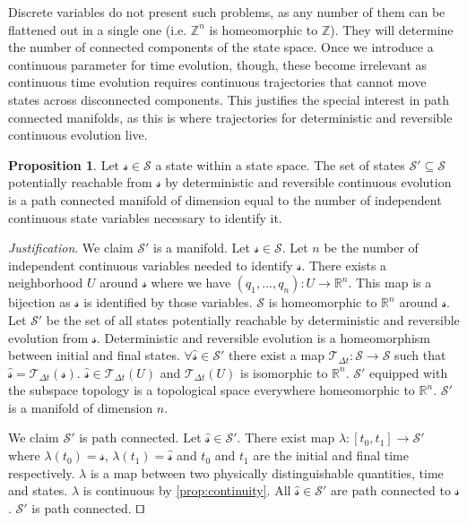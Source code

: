 \documentclass[smallextended]{svjour3}
\numberwithin{equation}{section}
\newenvironment{justification}{\emph{Justification}.}{\hfill\(\qed\)}
\theoremstyle{definition}
\newtheorem{prop}[equation]{Proposition}
\newenvironment{justification}{\emph{Justification}.}{\qed}
\begin{document}
Discrete variables do not present such problems, as any number of them can be flattened out in a single one (i.e. $\mathbb{Z}^n$ is homeomorphic to $\mathbb{Z}$). They will determine the number of connected components of the state space. Once we introduce a continuous parameter for time evolution, though, these become irrelevant as continuous time evolution requires continuous trajectories that cannot move states across disconnected components. This justifies the special interest in path connected manifolds, as this is where trajectories for deterministic and reversible continuous evolution live.

\begin{prop}\label{prop:manifold}
	Let $\mathcal{s} \in \mathcal{S}$ a state within a state space. The set of states $\mathcal{S}'\subseteq\mathcal{S}$ potentially reachable from $\mathcal{s}$ by deterministic and reversible continuous evolution is a path connected manifold of dimension equal to the number of independent continuous state variables necessary to identify it.
\end{prop}

\begin{justification}
	We claim $\mathcal{S}'$ is a manifold. Let $\mathcal{s} \in \mathcal{S}$. Let $n$ be the number of independent continuous variables needed to identify $\mathcal{s}$. There exists a neighborhood $U$ around $\mathcal{s}$ where we have $(q_1,...,q_n):U\rightarrow \mathbb{R}^n$. This map is a bijection as $\mathcal{s}$ is identified by those variables. $\mathcal{S}$ is homeomorphic to $\mathbb{R}^n$ around  $\mathcal{s}$. Let $\mathcal{S}'$ be the set of all states potentially reachable by deterministic and reversible evolution from $\mathcal{s}$. Deterministic and reversible evolution is a homeomorphism between initial and final states. $\forall \hat{\mathcal{s}} \in \mathcal{S}'$ there exist a map $\mathcal{T}_{\Delta t}:\mathcal{S} \rightarrow \mathcal{S}$ such that $\hat{\mathcal{s}} =\mathcal{T}_{\Delta t}(\mathcal{s})$. $\hat{\mathcal{s}} \in \mathcal{T}_{\Delta t}(U)$ and $\mathcal{T}_{\Delta t}(U)$ is isomorphic to $\mathbb{R}^n$. $\mathcal{S}'$ equipped with the subspace topology is a topological space everywhere homeomorphic to $\mathbb{R}^n$. $\mathcal{S}'$ is a manifold of dimension $n$.
	
	We claim $\mathcal{S}'$ is path connected. Let $\hat{\mathcal{s}} \in \mathcal{S}'$. There exist map $\lambda : [t_0,t_1] \rightarrow \mathcal{S}'$ where $\lambda(t_0)=\mathcal{s}$, $\lambda(t_1)=\hat{\mathcal{s}}$ and $t_0$ and $t_1$ are the initial and final time respectively. $\lambda$ is a map between two physically distinguishable quantities, time and states. $\lambda$ is continuous by \ref{prop:continuity}. All $\hat{\mathcal{s}} \in \mathcal{S}'$ are path connected to $\mathcal{s}$. $\mathcal{S}'$ is path connected.
\end{justification}
\end{document}

